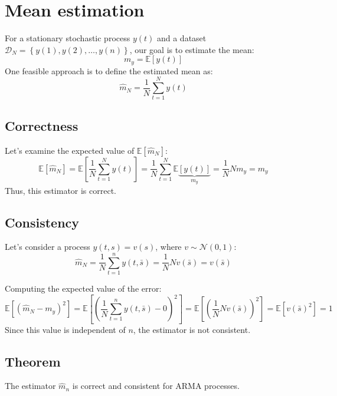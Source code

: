 \section{Mean estimation}

For a stationary stochastic process $y(t)$ and a dataset $\mathcal{D}_N=\left\{ y(1),y(2),\dots,y(n) \right\}$, our goal is to estimate the mean:
\[m_y=\mathbb{E}\left[y(t)\right]\]
One feasible approach is to define the estimated mean as:
\[\hat{m}_N=\dfrac{1}{N}\sum_{t=1}^{N}y(t)\]

\subsection{Correctness}
Let's examine the expected value of $\mathbb{E}\left[ \hat{m}_N\right]$: 
\[\mathbb{E}\left[ \hat{m}_N\right]=\mathbb{E}\left[ \dfrac{1}{N}\sum_{t=1}^{N}y(t) \right]= \dfrac{1}{N}\sum_{t=1}^{N}\mathbb{E}\underbrace{\left[y(t) \right]}_{m_y}= \dfrac{1}{N}N{m_y}= m_y\]
Thus, this estimator is correct.

\subsection{Consistency}
Let's consider a process $y(t,s)=v(s)$, where $v\sim \mathcal{N}(0,1)$: 
\[\hat{m}_N=\dfrac{1}{N}\sum_{t=1}^n y(t,\bar{s})=\dfrac{1}{N}Nv(\bar{s})=v(\bar{s})\]

Computing the expected value of the error:
\[\mathbb{E}\left[\left(\hat{m}_N-m_y\right)^2\right]=\mathbb{E}\left[\left(\dfrac{1}{N}\sum_{t=1}^n y(t,\bar{s})-0\right)^2\right]=\mathbb{E}\left[\left(\dfrac{1}{N}N v(\bar{s})\right)^2\right]=\mathbb{E}\left[v(\bar{s})^2\right]= 1\]
Since this value is independent of $n$, the estimator is not consistent.

\subsection{Theorem}     
\begin{theorem}
    The estimator $\hat{m}_n$ is correct and consistent for ARMA processes. 
\end{theorem}